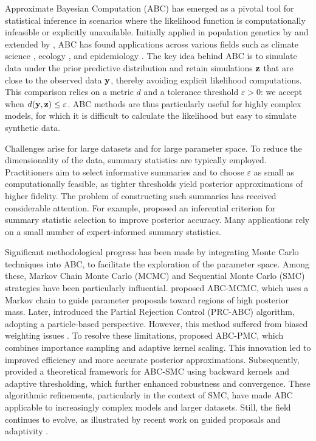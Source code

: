 Approximate Bayesian Computation (ABC) \citep{marinApproximateBayesianComputational2012a} has emerged as a pivotal tool for statistical inference in scenarios where the likelihood function is computationally infeasible or explicitly unavailable. Initially applied in population genetics by \citet{tavareInferringCoalescenceTimes1997} and extended by \citet{pritchardPopulationGrowthHuman1999a}, ABC has found applications across various fields such as climate science \citep{holden2018abc}, ecology \citep{piccioni2022calibration}, and epidemiology \citep{sissonHandbookApproximateBayesian2018}. The key idea behind ABC is to simulate data under the prior predictive distribution and retain simulations $\mathbf{z}$ that are close to the observed data $\mathbf{y}$, thereby avoiding explicit likelihood computations. This comparison relies on a metric $d$ and a tolerance threshold $\varepsilon > 0$: we accept when $d(\mathbf{y}, \mathbf{z})\leq\varepsilon$. ABC methods are thus particularly useful for highly complex models, for which it is difficult to calculate the likelihood but easy to simulate synthetic data.

Challenges arise for large datasets and for large parameter space. 
To reduce the dimensionality of the data, summary statistics are typically employed. Practitioners aim to select informative summaries and to choose $\varepsilon$ as small as computationally feasible, as tighter thresholds yield posterior approximations of higher fidelity. The problem of constructing such summaries has received considerable attention. For example, \citet{fearnheadConstructingSummaryStatistics2012} proposed an inferential criterion for summary statistic selection to improve posterior accuracy. Many applications rely on a small number of expert-informed summary statistics.

Significant methodological progress has been made by integrating Monte Carlo techniques into ABC, to facilitate the exploration of the parameter space. Among these, Markov Chain Monte Carlo (MCMC) and Sequential Monte Carlo (SMC) strategies have been particularly influential. \citet{marjoramMarkovChainMonte2003a} proposed ABC-MCMC, which uses a Markov chain to guide parameter proposals toward regions of high posterior mass. Later, \citet{sisson2007sequential} introduced the Partial Rejection Control (PRC-ABC) algorithm, adopting a particle-based perspective. However, this method suffered from biased weighting issues \citep{sissonCorrectionSissonSequential2009}. 
To resolve these limitations, \citet{beaumontAdaptiveApproximateBayesian2009b} proposed ABC-PMC, which combines importance sampling and adaptive kernel scaling. This innovation led to improved efficiency and more accurate posterior approximations. Subsequently, \citet{delmoralAdaptiveSequentialMonte2012} provided a theoretical framework for ABC-SMC using backward kernels and adaptive thresholding, which further enhanced robustness and convergence. These algorithmic refinements, particularly in the context of SMC, have made ABC applicable to increasingly complex models and larger datasets. Still, the field continues to evolve, as illustrated by recent work on guided proposals and adaptivity \citep{picchini2024guided}.

